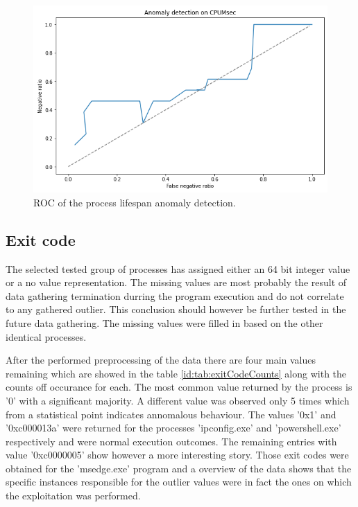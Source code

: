 \documentclass[a4paper,twoside,12pt]{book}
\begin{document}
\begin{figure}
	\centering
	\includegraphics[scale=0.9]{images/ROCCPUMsec}
	\caption{ROC of the process lifespan anomaly detection.}
	\label{fig:CPUMsecROC}
 \end{figure}

\subsection{Exit code}

The selected tested group of processes has assigned either an 64 bit integer value or a no value representation.
The missing values are most probably the result of data gathering termination durring the program execution and
do not correlate to any gathered outlier. This conclusion should however be further tested in the future data gathering.
The missing values were filled in based on the other identical processes.

After the performed preprocessing of the data there are four main values remaining which are showed in the table \ref{id:tab:exitCodeCounts}
along with the counts off occurance for each. The most common value returned by the process is '0' with a significant majority. A different 
value was observed only 5 times which from a statistical point indicates annomalous behaviour. The values '0x1' and '0xc000013a' were
returned for the processes 'ipconfig.exe' and 'powershell.exe' respectively and were normal execution outcomes. The remaining 
entries with value '0xc0000005' show however a more interesting story. Those exit codes were obtained for the 'msedge.exe' program
and a overview of the data shows that the specific instances responsible for the outlier values were in fact the ones on which the 
exploitation was performed. 
\end{document}
